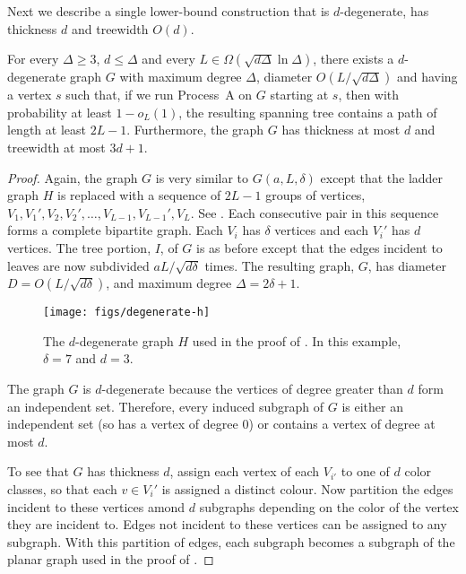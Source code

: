 \documentclass[lotsofwhite]{patmorin}
\begin{document}
Next we describe a single lower-bound construction that is $d$-degenerate,
has thickness $d$ and treewidth $O(d)$.

\begin{thm}
  For every $\Delta\ge 3$, $d\le \Delta$ and every
  $L\in\Omega(\sqrt{d\Delta}\ln\Delta)$, there exists a $d$-degenerate
  graph $G$ with maximum degree $\Delta$, diameter $O(L/\sqrt{d\Delta})$
  and having a vertex $s$ such that, if we run Process~A on $G$ starting
  at $s$, then with probability at least $1-o_L(1)$, the resulting
  spanning tree contains a path of length at least $2L-1$. Furthermore,
  the graph $G$ has thickness at most $d$ and treewidth at most $3d+1$.
\end{thm}

\begin{proof}
  Again, the graph $G$ is very similar to $G(a, L,\delta)$ except that
  the ladder graph $H$ is replaced with a sequence of $2L-1$ groups
  of vertices, $V_{1},V_{1}',V_2,V_2',\ldots,V_{L-1},V_{L-1}',V_L$.
  See .  Each consecutive pair in this sequence
  forms a complete bipartite graph.  Each $V_i$ has $\delta$ vertices
  and each $V_i'$ has $d$ vertices.  The tree portion, $I$, of $G$ is
  as before except that the edges incident to leaves are now subdivided
  $aL/\sqrt{d\delta}$ times.  The resulting graph, $G$, has diameter
  $D=O(L/\sqrt{d\delta})$, and maximum degree $\Delta = 2\delta+1$.

  \begin{figure}
    \begin{center}
       \texttt{[image: figs/degenerate-h]}
    \end{center}
    \caption{The $d$-degenerate graph $H$ used in the proof of
       . In this example, $\delta=7$
        and $d=3$.}
  \end{figure}

  The graph $G$ is $d$-degenerate because the vertices of degree greater
  than $d$ form an independent set. Therefore, every induced subgraph
  of $G$ is either an independent set (so has a vertex of degree 0)
  or contains a vertex of degree at most $d$.

  To see that $G$ has thickness $d$, assign each vertex of each
  $V_{i'}$ to one of $d$ color classes, so that each $v\in V_i'$ is
  assigned a distinct colour.   Now partition the edges incident to
  these vertices amond $d$ subgraphs depending on the color of the
  vertex they are incident to.  Edges not incident to these vertices
  can be assigned to any subgraph.  With this partition of edges, each
  subgraph becomes a subgraph of the planar graph used in the proof of
  .


\end{proof}
\end{document}
